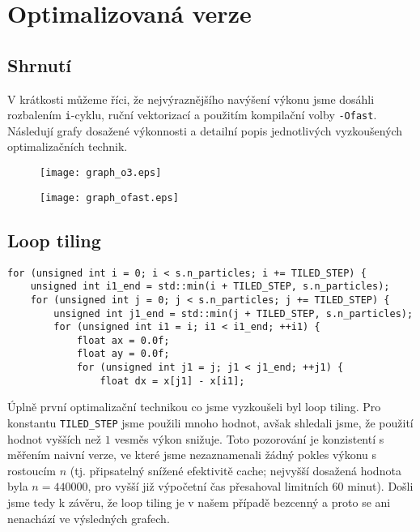 \documentclass[10pt,a4paper]{article}
\begin{document}
\vspace{10pt}
\section{Optimalizovaná verze}

\subsection{Shrnutí}
V krátkosti můžeme říci, že nejvýraznějšího navýšení výkonu jsme
dosáhli rozbalením \texttt{i}-cyklu, ruční vektorizací a použitím
kompilační volby \texttt{-Ofast}. Následují grafy dosažené výkonnosti
a detailní popis jednotlivých vyzkoušených optimalizačních technik.

\begin{figure}[h]
    \centering
    \texttt{[image: graph\_o3.eps]}
    \label{fig:1}
\end{figure}

\begin{figure}[h]
    \centering
    \texttt{[image: graph\_ofast.eps]}
    \label{fig:2}
\end{figure}

\subsection{Loop tiling}
\begin{lstlisting}
for (unsigned int i = 0; i < s.n_particles; i += TILED_STEP) {
    unsigned int i1_end = std::min(i + TILED_STEP, s.n_particles);
    for (unsigned int j = 0; j < s.n_particles; j += TILED_STEP) {
        unsigned int j1_end = std::min(j + TILED_STEP, s.n_particles);
        for (unsigned int i1 = i; i1 < i1_end; ++i1) {
            float ax = 0.0f;
            float ay = 0.0f;
            for (unsigned int j1 = j; j1 < j1_end; ++j1) {
                float dx = x[j1] - x[i1];
\end{lstlisting}

Úplně první optimalizační technikou co jsme vyzkoušeli byl loop
tiling. Pro konstantu \texttt{TILED\_STEP} jsme použili mnoho hodnot,
avšak shledali jsme, že použití hodnot vyšších než $ 1 $ vesměs výkon
snižuje. Toto pozorování je konzistentí s měřením naivní verze, ve
které jsme nezaznamenali žádný pokles výkonu s rostoucím $ n $
(tj. připsatelný snížené efektivitě cache; nejvyšší dosažená hodnota
byla $ n = 440000 $, pro vyšší již výpočetní čas přesahoval limitních
60 minut). Došli jsme tedy k závěru, že loop tiling je v našem případě
bezcenný a proto se ani nenachází ve výsledných grafech.
\end{document}
